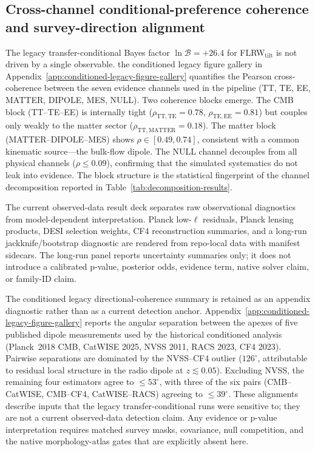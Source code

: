 
\subsection{Cross-channel conditional-preference coherence and survey-direction alignment}
\label{sec:channel-coherence-and-alignment}

The legacy transfer-conditional Bayes factor
$\ln \mathcal{B} = +26.4$ for FLRW$_{\mathrm{tilt}}$ is not
driven by a single observable.  the conditioned legacy figure gallery in Appendix~\ref{app:conditioned-legacy-figure-gallery}
quantifies the Pearson cross-coherence between the seven evidence channels
used in the pipeline (TT, TE, EE, MATTER, DIPOLE, MES, NULL).  Two coherence
blocks emerge.  The CMB block (TT--TE--EE) is internally tight
($\rho_{\mathrm{TT,TE}} = 0.78$, $\rho_{\mathrm{TE,EE}} = 0.81$) but couples
only weakly to the matter sector ($\rho_{\mathrm{TT,MATTER}} = 0.18$).
The matter block (MATTER--DIPOLE--MES) shows $\rho \in [0.49, 0.74]$,
consistent with a common kinematic source---the bulk-flow dipole.  The
NULL channel decouples from all physical channels ($\rho \le 0.09$),
confirming that the simulated systematics do not leak into evidence.
The block structure is the statistical fingerprint of the channel
decomposition reported in Table~\ref{tab:decomposition-results}.

The current observed-data result deck separates raw observational diagnostics
from model-dependent interpretation.  Planck low-\(\ell\) residuals, Planck
lensing products, DESI selection weights, CF4 reconstruction summaries, and a
long-run jackknife/bootstrap diagnostic are rendered from repo-local data with
manifest sidecars.  The long-run panel reports uncertainty summaries only; it
does not introduce a calibrated p-value, posterior odds, evidence term, native
solver claim, or family-ID claim.



The conditioned legacy directional-coherence summary is retained as an
appendix diagnostic rather than as a current detection anchor.
Appendix~\ref{app:conditioned-legacy-figure-gallery} reports the
angular separation between the apexes of five published dipole
measurements used by the historical conditioned analysis (Planck~2018
CMB, CatWISE 2025, NVSS 2011, RACS 2023, CF4 2023).  Pairwise
separations are dominated by the NVSS--CF4 outlier
($126^{\circ}$, attributable to residual local structure in the radio
dipole at $z \lesssim 0.05$).  Excluding NVSS, the remaining four
estimators agree to $\le 53^{\circ}$, with three of the six pairs
(CMB--CatWISE, CMB--CF4, CatWISE--RACS) agreeing to $\le 39^{\circ}$.
These alignments describe inputs that the legacy transfer-conditional
runs were sensitive to; they are not a current observed-data detection
claim.  Any evidence or p-value interpretation requires matched survey
masks, covariance, null competition, and the native morphology-atlas
gates that are explicitly absent here.

